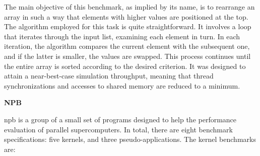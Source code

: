 The main objective of this benchmark, as implied by its name, is to rearrange an array in such a way that elements with higher values are 
positioned at the top. The algorithm employed for this task is quite straightforward. It involves a loop that iterates through the input list, 
examining each element in turn. In each iteration, the algorithm compares the current element with the subsequent one, and if the latter is 
smaller, the values are swapped. This process continues until the entire array is sorted according to the desired criterion. It was designed 
to attain a near-best-case simulation throughput, meaning that thread synchronizations and accesses to shared memory are reduced to a minimum.
\newline




\textbf{NPB}
\newline

\gls{npb} \cite{bailey1994parallel} is a group of a small set of programs designed to help the performance evaluation of parallel 
supercomputers. In total, there are eight benchmark specifications: five kernels, and three pseudo-applications. The kernel benchmarks are:

